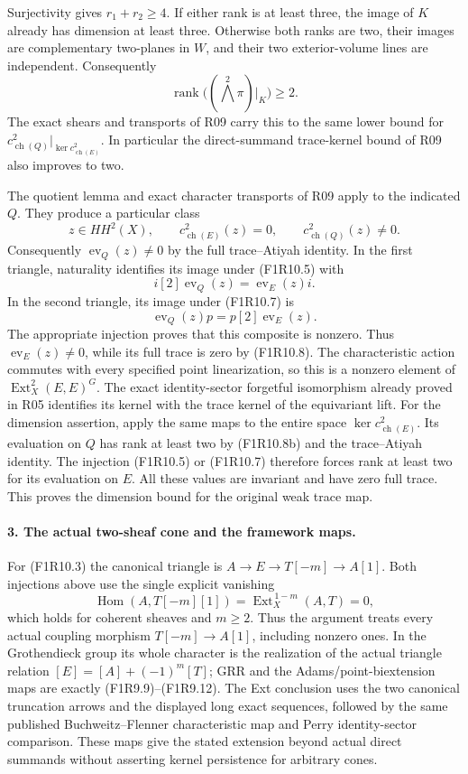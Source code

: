 Surjectivity gives $r_1+r_2\ge4$. If either rank is at least
three, the image of $K$ already has dimension at least three.
Otherwise both ranks are two, their images are complementary
two-planes in $W$, and their two exterior-volume lines are
independent. Consequently
\[
       \operatorname{rank}\bigl((\bigwedge^2\pi)|_K\bigr)\ge2.
 \tag{F1R10.8b}
\]
The exact shears and transports of R09 carry this to the same
lower bound for
$c^2_{\operatorname{ch}(Q)}|_{\ker c^2_{\operatorname{ch}(E)}}$.
In particular the direct-summand trace-kernel bound of R09
also improves to two.

The quotient lemma and exact character transports of R09 apply
to the indicated $Q$. They produce a particular class
\[
 z\in HH^2(X),\qquad
 c^2_{\operatorname{ch}(E)}(z)=0,\qquad
 c^2_{\operatorname{ch}(Q)}(z)\ne0.
 \tag{F1R10.8}
\]
Consequently $\operatorname{ev}_Q(z)\ne0$ by the full
trace--Atiyah identity. In the first triangle, naturality
identifies its image under (F1R10.5) with
\[
 i[2]\operatorname{ev}_Q(z)
               =\operatorname{ev}_E(z)i.
 \tag{F1R10.9}
\]
In the second triangle, its image under (F1R10.7) is
\[
 \operatorname{ev}_Q(z)p
               =p[2]\operatorname{ev}_E(z).
 \tag{F1R10.10}
\]
The appropriate injection proves that this composite is
nonzero. Thus $\operatorname{ev}_E(z)\ne0$, while its
full trace is zero by (F1R10.8). The characteristic action
commutes with every specified point linearization, so this
is a nonzero element of
$\operatorname{Ext}^2_X(E,E)^G$. The exact identity-sector
forgetful isomorphism already proved in R05 identifies its
kernel with the trace kernel of the equivariant lift.
For the dimension assertion, apply the same maps to the entire
space $\ker c^2_{\operatorname{ch}(E)}$. Its evaluation on $Q$
has rank at least two by (F1R10.8b) and the trace--Atiyah
identity. The injection (F1R10.5) or (F1R10.7) therefore forces
rank at least two for its evaluation on $E$. All these values
are invariant and have zero full trace. This proves the
dimension bound for the original weak trace map.

\paragraph{3. The actual two-sheaf cone and the framework maps.}
For (F1R10.3) the canonical triangle is
$A\to E\to T[-m]\to A[1]$. Both injections above use the
single explicit vanishing
\[
 \operatorname{Hom}(A,T[-m][1])
                    =\operatorname{Ext}^{\,1-m}_X(A,T)=0,
 \tag{F1R10.11}
\]
which holds for coherent sheaves and $m\ge2$. Thus the
argument treats every actual coupling morphism
$T[-m]\to A[1]$, including nonzero ones. In the
Grothendieck group its whole character is the realization
of the actual triangle relation
$[E]=[A]+(-1)^m[T]$; GRR and the Adams/point-biextension
maps are exactly (F1R9.9)--(F1R9.12). The Ext conclusion
uses the two canonical truncation arrows and the displayed
long exact sequences, followed by the same published
Buchweitz--Flenner characteristic map and Perry
identity-sector comparison. These maps give the stated
extension beyond actual direct summands without asserting
kernel persistence for arbitrary cones.

